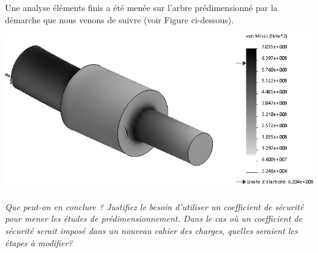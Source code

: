 \documentclass[10pt,fleqn]{article} %
\begin{document}
\begin{multicols}{2}
Une analyse éléments finis a été menée sur l'arbre prédimensionné par la démarche que nous venons de suivre (voir Figure ci-dessous).

\begin{center}
\includegraphics[width=.4\linewidth]{images/EF}
\end{center}


\subparagraph{}\textit{Que peut-on en conclure ? Justifiez le besoin d'utiliser un coefficient de sécurité pour mener les études de prédimensionnement. 
Dans le cas où un coefficient de sécurité serait imposé dans un nouveau cahier des charges, quelles seraient les étapes à modifier?}





\end{multicols}
\end{document}
